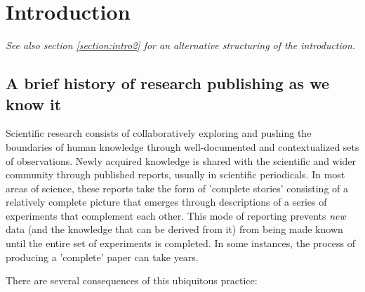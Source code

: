 \documentclass[final,authoryear,3p]{elsarticle-open-drafting}
\begin{document}
\newpage
\tableofcontents


\section{Introduction}
\label{section:intro}
{\it See also section \ref{section:intro2} for an alternative structuring of the introduction.}

\subsection{A brief history of research publishing as we know it}

Scientific research consists of collaboratively exploring and pushing the boundaries of human knowledge through well-documented and contextualized sets of observations. Newly acquired knowledge is shared with the scientific and wider community through published reports, usually in scientific periodicals. In most areas of science, these reports take the form of 'complete stories' consisting of a relatively complete picture that emerges through descriptions of a series of experiments that complement each other. This mode of reporting prevents {\it new} data (and the knowledge that can be derived from it) from being made known until the entire set of experiments is completed. In some instances, the process of producing a 'complete' paper can take years.

There are several consequences of this ubiquitous practice:
\end{document}
